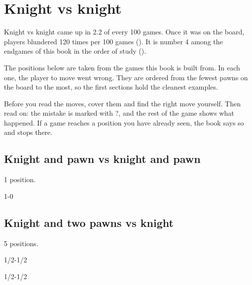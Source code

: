 \chapter{Knight vs knight}\label{ch:knight-vs-knight}
Knight vs knight came up in 2.2 of every 100 games. Once it was on the board, players blundered 120 times per 100 games (). It is number 4 among the endgames of this book in the order of study ().

The positions below are taken from the games this book is built from. In each one, the player to move went wrong. They are ordered from the fewest pawns on the board to the most, so the first sections hold the cleanest examples.

Before you read the moves, cover them and find the right move yourself. Then read on: the mistake is marked with ?, and the rest of the game shows what happened. If a game reaches a position you have already seen, the book says so and stops there.


\section{Knight and pawn vs knight and pawn}
1 position.


1-0\par
\section{Knight and two pawns vs knight}
5 positions.


1/2-1/2\par
{}

1/2-1/2\par
{}

